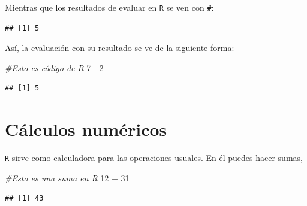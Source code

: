 \documentclass[
]{book}
\newenvironment{Shaded}{\begin{snugshade}}{\end{snugshade}}
\newcommand{\CommentTok}[1]{\textcolor[rgb]{0.56,0.35,0.01}{\textit{#1}}}
\newcommand{\DecValTok}[1]{\textcolor[rgb]{0.00,0.00,0.81}{#1}}
\newcommand{\SpecialCharTok}[1]{\textcolor[rgb]{0.00,0.00,0.00}{#1}}
\begin{document}
Mientras que los resultados de evaluar en \texttt{R} se ven con \texttt{\#}:

\begin{verbatim}
## [1] 5
\end{verbatim}

Así, la evaluación con su resultado se ve de la siguiente forma:

\begin{Shaded}
\begin{Highlighting}[]
\CommentTok{\#Esto es código de R}
\DecValTok{7} \SpecialCharTok{{-}} \DecValTok{2}
\end{Highlighting}
\end{Shaded}

\begin{verbatim}
## [1] 5
\end{verbatim}

\hypertarget{cuxe1lculos-numuxe9ricos}{%
\section{Cálculos numéricos}\label{cuxe1lculos-numuxe9ricos}}

\texttt{R} sirve como calculadora para las operaciones usuales. En él puedes hacer sumas,

\begin{Shaded}
\begin{Highlighting}[]
\CommentTok{\#Esto es una suma en R}
\DecValTok{12} \SpecialCharTok{+} \DecValTok{31}
\end{Highlighting}
\end{Shaded}

\begin{verbatim}
## [1] 43
\end{verbatim}
\end{document}
